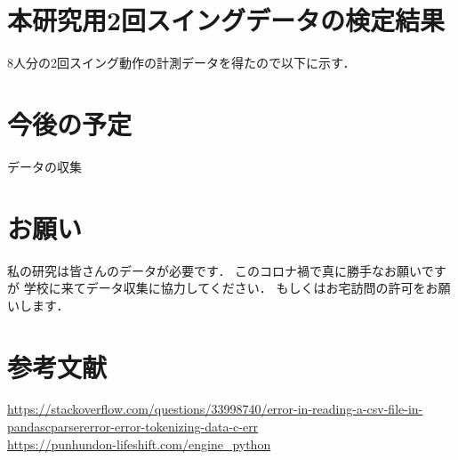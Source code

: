     \section{本研究用2回スイングデータの検定結果}

        8人分の2回スイング動作の計測データを得たので以下に示す．

    \section{今後の予定}
        データの収集

    \section{お願い}
        私の研究は皆さんのデータが必要です．
        このコロナ禍で真に勝手なお願いですが
        学校に来てデータ収集に協力してください．
        もしくはお宅訪問の許可をお願いします．
    
    \section{参考文献}
        \url{https://stackoverflow.com/questions/33998740/error-in-reading-a-csv-file-in-pandascparsererror-error-tokenizing-data-c-err}\\

        \url{https://punhundon-lifeshift.com/engine_python}

